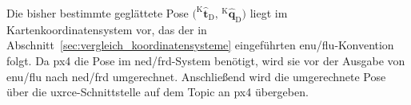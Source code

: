 Die bisher bestimmte geglättete Pose $\bigl(^{\mathrm{K}}\hat{\mathbf{t}}_{\mathrm{D}},\,{^{\mathrm{K}}\hat{\mathbf{q}}_{\mathrm{D}}}\bigr)$
liegt im Kartenkoordinatensystem vor, das der in Abschnitt~\ref{sec:vergleich_koordinatensysteme} eingeführten \gls{enu}/\gls{flu}-Konvention folgt.
Da \gls{px4} die Pose im \gls{ned}/\gls{frd}-System benötigt, wird sie vor der Ausgabe von \gls{enu}/\gls{flu} nach \gls{ned}/\gls{frd} umgerechnet.
Anschließend wird die umgerechnete Pose über die \gls{uxrce}-Schnittstelle auf dem Topic  an \gls{px4} übergeben.
